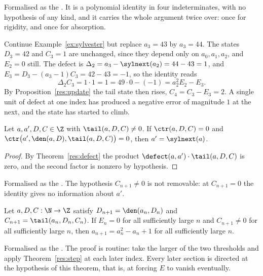 \noindent Formalised as the
.  It is a polynomial identity in four indeterminates, with no
hypothesis of any kind, and it carries the whole argument twice over: once for
rigidity, and once for absorption.

\begin{example}\label{ex:defect}
Continue Example~\ref{ex:sylvester} but replace $a_3=43$ by $a_3=44$.  The
states $D_3=42$ and $C_3=1$ are unchanged, since they depend only on
$a_0,a_1,a_2$, and $E_2=0$ still.  The defect is
$\Delta_2=a_3-\sylnext(a_2)=44-43=1$, and
$E_3=D_3-(a_3-1)C_3=42-43=-1$, so the identity reads
\[
 \Delta_2C_3=1\cdot1=1=49\cdot0-(-1)=a_2^{2}E_2-E_3 .
\]
By Proposition~\ref{res:update} the tail state then rises, $C_4=C_3-E_3=2$.  A
single unit of defect at one index has produced a negative error of magnitude
$1$ at the next, and the state has started to climb.
\end{example}

\begin{theorem}\label{res:step}
Let $a,a',D,C\in\Z$ with $\tail(a,D,C)\ne0$.  If
$\ctr(a,D,C)=0$ and $\ctr\bigl(a',\den(a,D),\tail(a,D,C)\bigr)=0$, then
$a'=\sylnext(a)$.
\end{theorem}

\begin{proof}
By Theorem~\ref{res:defect} the product $\defect(a,a')\cdot\tail(a,D,C)$ is
zero, and the second factor is nonzero by hypothesis.
\end{proof}

\noindent Formalised as the
.  The hypothesis $C_{n+1}\ne0$ is not removable: at $C_{n+1}=0$
the identity gives no information about $a'$.

\begin{theorem}\label{res:eventual}
Let $a,D,C:\N\to\Z$ satisfy $D_{n+1}=\den(a_n,D_n)$ and
$C_{n+1}=\tail(a_n,D_n,C_n)$.  If $E_n=0$ for all sufficiently large $n$ and
$C_{n+1}\ne0$ for all sufficiently large $n$, then $a_{n+1}=a_n^{2}-a_n+1$ for
all sufficiently large $n$.
\end{theorem}

\noindent Formalised as the
.  The proof is routine: take the larger of the two
thresholds and apply Theorem~\ref{res:step} at each later index.  Every later
section is directed at the hypothesis of this theorem, that is, at forcing $E$
to vanish eventually.

